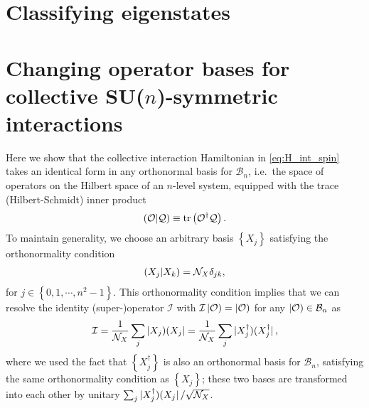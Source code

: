 \documentclass[nofootinbib,notitlepage,11pt]{revtex4-2}
\newcommand{\f}[2]{\dfrac{#1}{#2}} %
\newcommand{\p}[1]{\left(#1\right)} %
\renewcommand{\set}[1]{\left\{#1\right\}} %
\newcommand{\1}{\mathds{1}}
\newcommand{\B}{\mathcal{B}}
\newcommand{\I}{\mathcal{I}}
\newcommand{\N}{\mathcal{N}}
\renewcommand{\O}{\mathcal{O}}
\newcommand{\Q}{\mathcal{Q}}
\def\obra#1{\mathinner{({#1}|}}
\def\oket#1{\mathinner{|{#1})}}
\def\obk#1{\mathinner{({#1})}}
\def\oop#1#2{\oket{#1}\!\obra{#2}}
\begin{document}
\section{Classifying eigenstates}




\appendix

\section{Changing operator bases for collective SU($n$)-symmetric
  interactions}
\label{sec:changing_bases}

Here we show that the collective interaction Hamiltonian in
\eqref{eq:H_int_spin} takes an identical form in any orthonormal basis
for $\B_n$, i.e.~the space of operators on the Hilbert space of an
$n$-level system, equipped with the trace (Hilbert-Schmidt) inner
product
\begin{align}
  \obk{\O|\Q} \equiv \tr\p{\O^\dag \Q}.
\end{align}
To maintain generality, we choose an arbitrary basis $\set{X_j}$
satisfying the orthonormality condition
\begin{align}
  \obk{X_j|X_k} = \N_X \delta_{jk},
\end{align}
for $j\in\set{0,1,\cdots,n^2-1}$.  This orthonormality condition
implies that we can resolve the identity (super-)operator $\I$ with
$\I\oket{\O}=\oket{\O}$ for any $\oket\O\in\B_n$ as
\begin{align}
  \I = \f1{\N_X} \sum_j \oop{X_j}{X_j}
  = \f1{\N_X} \sum_j \oop{X_j^\dag}{X_j^\dag},
\end{align}
where we used the fact that $\set{X_j^\dag}$ is also an orthonormal
basis for $\B_n$, satisfying the same orthonormality condition as
$\set{X_j}$; these two bases are transformed into each other by
unitary $\sum_j\oop{X_j^\dag}{X_j}/\sqrt{\N_X}$.
\end{document}

